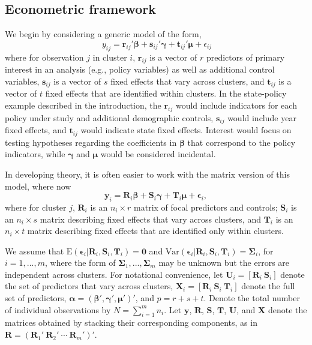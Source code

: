 \documentclass[12pt]{article}\usepackage[]{graphicx}\usepackage[]{color}
\newcommand{\E}{\text{E}}
\newcommand{\Var}{\text{Var}}
\newcommand{\bm}{\mathbf}
\newcommand{\bs}{\boldsymbol}
\begin{document}
\subsection{Econometric framework}

We begin by considering a generic model of the form,
\begin{equation}
\label{eq:fixed_effects_ij}
\ {y}_{ij} = \bm{r}_{ij}' \bs\beta + \bm{s}_{ij}' \bs\gamma + \bm{t}_{ij}' \bs\mu + \epsilon_{ij} 
\end{equation}
where for observation $j$ in cluster $i$, $\bm{r}_{ij}$ is a vector of $r$ predictors of primary interest in an analysis (e.g., policy variables) as well as additional control variables, $\bm{s}_{ij}$ is a vector of $s$ fixed effects that vary across clusters, and $\bm{t}_{ij}$ is a vector of $t$ fixed effects that are identified within clusters. In the state-policy example described in the introduction, the $\bm{r}_{ij}$ would include indicators for each policy under study and additional demographic controls, $\bm{s}_{ij}$ would include year fixed effects, and $\bm{t}_{ij}$ would indicate state fixed effects. Interest would focus on testing hypotheses regarding the coefficients in $\bs\beta$ that correspond to the policy indicators, while $\bs\gamma$ and $\bs\mu$ would be considered incidental. 

In developing theory, it is often easier to work with the matrix version of this model, where now
\begin{equation}
\label{eq:fixed_effects}
\bm{y}_i = \bm{R}_i \bs\beta + \bm{S}_i \bs\gamma + \bm{T}_i \bs\mu + \bs\epsilon_i,
\end{equation}
where for cluster $j$, $\bm{R}_i$ is an $n_i \times r$ matrix of focal predictors and controls; $\bm{S}_i$ is an $n_i \times s$ matrix describing fixed effects that vary across clusters, and $\bm{T}_i$ is an $n_i \times t$ matrix describing fixed effects that are identified only within clusters. 

We assume that $\E\left(\bs\epsilon_i\left|\bm{R}_i,\bm{S}_i, \bm{T}_i\right.\right) = \bm{0}$ and $\Var\left(\bs\epsilon_i\left|\bm{R}_i,\bm{S}_i,\bm{T}_i\right.\right) = \bs\Sigma_i$, for $i = 1,...,m$, where the form of $\bs\Sigma_1,...,\bs\Sigma_m$ may be unknown but the errors are independent across clusters. 
For notational convenience, let $\bm{U}_i = \left[\bm{R}_i \ \bm{S}_i \right]$ denote the set of predictors that vary across clusters, $\bm{X}_i = \left[\bm{R}_i \ \bm{S}_i \ \bm{T}_i \right]$ denote the full set of predictors, $\bs\alpha = \left(\bs\beta', \bs\gamma', \bs\mu' \right)'$, and $p = r + s + t$.
Denote the total number of individual observations by $N = \sum_{i=1}^m n_i$.
Let $\bm{y}$, $\bm{R}$, $\bm{S}$, $\bm{T}$, $\bm{U}$, and $\bm{X}$ denote the matrices obtained by stacking their corresponding components, as in $\bm{R} = \left(\bm{R}_1' \ \bm{R}_2' \ \cdots \ \bm{R}_m'\right)'$. 
\end{document}
